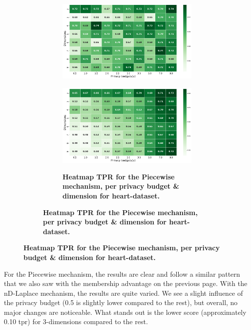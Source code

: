 {\begin{figure}[H]
\begin{subfigure}[b]{0.75\textwidth}
\begin{subfigure}[c]{1\textwidth}
            \includegraphics[width=1\textwidth]{Results/nd-laplace/nd-Laplace/heart-dataset/tpr.png}
            \label{fig:privacy_tpr_heart-dataset_adversial_advantage_kd-laplace}
        \end{subfigure}
        \vfill %

        \begin{subfigure}[c]{1\textwidth}
            \caption{\textbf{Heatmap TPR for the Piecewise mechanism, per privacy budget \& dimension for heart-dataset.}}
            \includegraphics[width=1\textwidth]{Results/nd-laplace/piecewise/heart-dataset/tpr.png}
            \label{fig:privacy_tpr_heart-dataset_adversial_advantage_piecewise}
        \end{subfigure}
    \end{subfigure}
\end{figure}
For the Piecewise mechanism, the results are clear and follow a similar pattern that we also saw with the membership advantage on the previous page.
With the nD-Laplace mechanism, the results are quite varied. We see a slight influence of the privacy budget (0.5 is slightly lower compared to the rest), but overall, no major changes are noticeable.
What stands out is the lower score (approximately 0.10 \gls{tpr}) for 3-dimensions compared to the rest.

}
